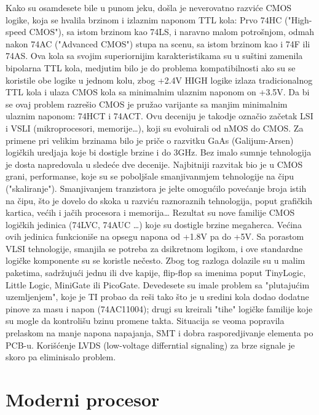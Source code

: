 \documentclass[12pt,a4paper]{article}
\begin{document}
Kako su osamdesete bile u punom jeku, došla je neverovatno razviće CMOS logike, koja se hvalila brzinom i izlaznim naponom TTL kola:
Prvo 74HC ("High-speed CMOS"), sa istom brzinom kao 74LS, i naravno malom potrošnjom, odmah nakon 74AC ("Advanced CMOS") stupa na scenu, sa istom brzinom kao i 74F ili 74AS.
Ova kola sa svojim superiornijim karakteristikama su u suštini zamenila bipolarna TTL kola, medjutim bilo je do problema kompatibilnosti ako su se koristile obe logike u jednom kolu, zbog +2.4V HIGH logike izlaza tradicionalnog TTL kola i ulaza CMOS kola sa minimalnim ulaznim naponom on +3.5V. 
Da bi se ovaj problem razrešio CMOS je pružao varijante sa manjim minimalnim ulaznim naponom: 74HCT i 74ACT. 
Ovu deceniju je takodje označio začetak LSI i VSLI (mikroprocesori, memorije\dots), koji su evoluirali od nMOS do CMOS. Za primene pri velikim brzinama bilo je priče o razvitku GaAs (Galijum-Arsen) logičkih uredjaja koje bi dostigle brzine i do 3GHz.
Bez imalo sumnje tehnologija je dosta napredovala u sledeće dve decenije. 
Najbitniji razvitak bio je u CMOS grani, performanse, koje su se poboljšale smanjivanmjem tehnologije na čipu ("skaliranje"). Smanjivanjem tranzistora je jelte omogućilo povećanje broja istih na čipu, što je dovelo do skoka u razviću raznoraznih tehnologija, poput grafičkih kartica, većih i jačih procesora i memorija\dots 
Rezultat su nove familije CMOS logičkih jedinica (74LVC, 74AUC \dots) koje su dostigle brzine megaherca. 
Većina ovih jedinica funkcioniše na opsegu napona od +1.8V pa do +5V.
Sa porastom VLSI tehnologije, smanjila se potreba za dsikretnom logikom, i ove standardne logičke komponente su se koristle nečesto. Zbog tog razloga dolazile su u malim paketima, sadržujući jednu ili dve kapije, flip-flop sa imenima poput TinyLogic, Little Logic, MiniGate ili PicoGate.
Devedesete su imale problem sa "plutajućim uzemljenjem", koje je TI probao da reši tako što je u sredini kola dodao dodatne pinove za masu i napon (74AC11004); drugi su kreirali "tihe" logičke familije koje su mogle da kontrolišu bzinu promene takta. 
Situacija se veoma popravila prelaskom na manje napona napajanja, SMT i dobra rasporedjivanje elementa po PCB-u.
Korišćenje LVDS (low-voltage differntial signaling) za brze signale je skoro pa eliminisalo problem.



\newpage
\section{Moderni procesor}

\newpage

\printbibliography[title={Reference}]
\end{document}
